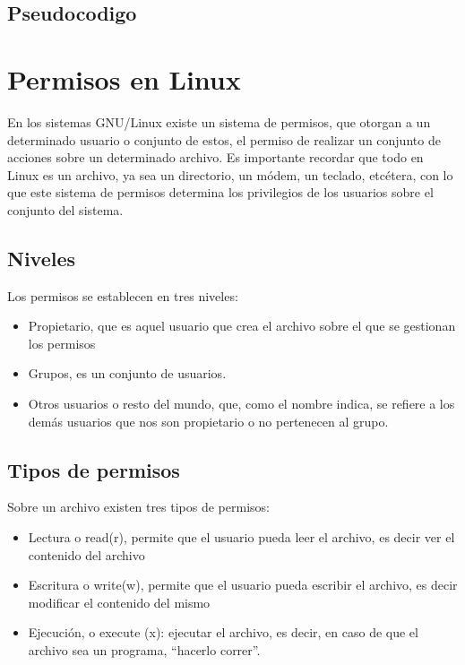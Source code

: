 \documentclass[12pt,a4paper]{article} %
\begin{document}
	\subsection{Pseudocodigo}
	\lstset{inputencoding=utf8/latin1, style = customc}
    
    \clearpage
	\section{Permisos en Linux}
	En los sistemas GNU/Linux existe un sistema de permisos, que otorgan a un determinado usuario o conjunto de estos, el permiso de realizar un conjunto de acciones sobre un determinado archivo. Es importante recordar que todo en Linux es un archivo, ya sea un directorio, un módem, un teclado, etcétera, con lo que este sistema de permisos determina los privilegios de los usuarios sobre el conjunto del sistema.\par
	\subsection{Niveles}
	Los permisos se establecen en tres niveles:
	\begin{itemize}
		\item Propietario, que es aquel usuario que crea el archivo sobre el que se gestionan los permisos
		\item Grupos, es un conjunto de usuarios.\par
		\item Otros usuarios o resto del mundo, que, como el nombre indica, se refiere a los demás usuarios que nos son propietario o no pertenecen al grupo.
	\end{itemize}
	\subsection{Tipos de permisos}
	Sobre un archivo existen tres tipos de permisos:
	\begin{itemize}
		\item Lectura o read(r), permite que el usuario pueda leer el archivo, es decir ver el contenido del archivo
		\item Escritura o write(w), permite que el usuario pueda escribir el archivo, es decir modificar el contenido del mismo
		\item Ejecución, o execute (x): ejecutar el archivo, es decir, en caso de que el archivo sea un programa, “hacerlo correr”.\par 
	\end{itemize}
\end{document}
